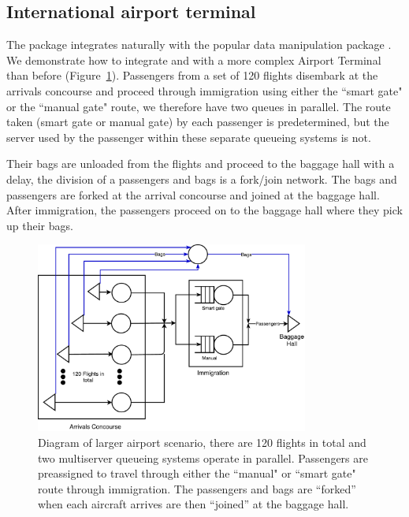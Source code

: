 \documentclass[article]{jss}
\begin{document}
\subsection{International airport terminal} \label{ssec:largerairport}

The package integrates naturally with the popular data manipulation  package  \citep{Rpkg_dplyr}. We demonstrate how to integrate  and  with a more complex Airport Terminal than before (Figure~\ref{fig:larger_airport}). Passengers from a set of 120 flights disembark at the arrivals concourse and proceed through immigration using either the ``smart gate" or the ``manual gate" route, we therefore have two queues in parallel. The route taken (smart gate or manual gate) by each passenger is predetermined, but the server used by the passenger within these separate queueing systems is not. 

Their bags are unloaded from the flights and proceed to the baggage hall with a delay, the division of a passengers and bags is a fork/join network. The bags and passengers are forked at the arrival concourse and joined at the baggage hall. After immigration, the passengers proceed on to the baggage hall where they pick up their bags. 

\begin{figure}[!htb]
\centering
\includegraphics[width = 0.8\textwidth]{Figures/Larger_airport.pdf}
\caption{Diagram of larger airport scenario, there are 120 flights in total and two multiserver queueing systems operate in parallel. Passengers are preassigned to travel through either the ``manual" or ``smart gate" route through immigration. The passengers and bags are ``forked'' when each aircraft arrives are then ``joined'' at the baggage hall. }
\label{fig:larger_airport}
\end{figure}
\end{document}
